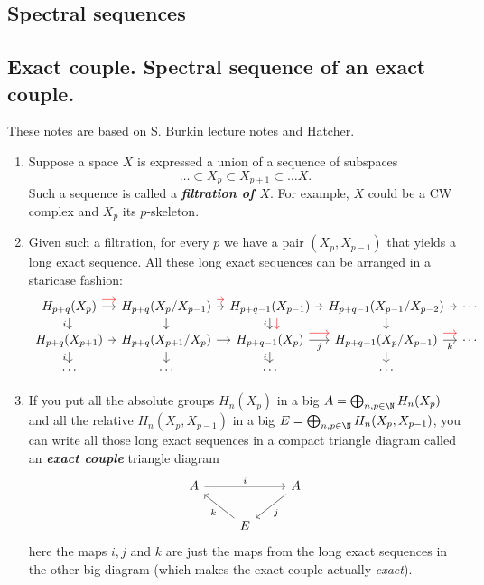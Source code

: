 \begin{remark}
\begin{defn}
\section{Spectral sequences}

\subsection{Exact couple. Spectral sequence of an exact couple.}

These notes are based on S. Burkin lecture notes and Hatcher.

\begin{enumerate}
	\item Suppose a space $X$ is expressed a union of a sequence of subspaces
		\[\ldots\subset X_p\subset X_{p+1}\subset \ldots X.\]
		Such a sequence is called a \textit{\textbf{filtration of $X$}}. For example, $X$ could be a CW complex and $X_p$ its $p$-skeleton.

	\item Given such a filtration, for every $p$ we have a pair $(X_p,X_{p-1})$ that yields a long exact sequence. All these long exact sequences can be arranged in a staricase fashion:
\[\begin{tikzcd}[column sep=tiny,row sep=small]
	H_{p+q}(X_p)\arrow[r]\arrow[d,"i",swap]\arrow[r,red,shift={(0,0.2)}]&H_{p+q}(X_p/X_{p-1})\arrow[r]\arrow[r,red,shift={(0,0.2)}]\arrow[d]&H_{p+q-1}(X_{p-1})\arrow[r]\arrow[d,red,shift={(0.2,0)}]\arrow[d,"i",swap]&H_{p+q-1}(X_{p-1}/X_{p-2})\arrow[d]\arrow[r]&\cdots\\
	H_{p+q}(X_{p+1})\arrow[r]\arrow[d,"i",swap]&H_{p+q}(X_{p+1}/X_{p})\arrow[r]\arrow[d]&H_{p+q-1}(X_{p})\arrow[r,"j",swap]\arrow[r,red,shift={(0,0.2)}]\arrow[d,"i",swap]&H_{p+q-1}(X_{p}/X_{p-1})\arrow[r,red,shift={(0,0.2)}]\arrow[d]\arrow[r,"k",swap]&\cdots\\
	\cdots&\cdots&\cdots&\cdots
\end{tikzcd}\]
	\item If you put all the absolute groups $H_n(X_p)$ in a big $A=\bigoplus_{n,p\in \N}H_n(X_p)$ and all the relative $H_n(X_p,X_{p-1})$ in a big $E=\bigoplus_{n,p\in \N}H_n(X_p,X_{p-1})$, you can write all those long exact sequences in a compact triangle diagram called an \textit{\textbf{exact couple}} triangle diagram
	\[
	\begin{tikzcd}
		A\arrow[rr,"i"]&&A\arrow[dl,"j"]\\
		&E\arrow[ul,"k"]
	\end{tikzcd}
\]
here the maps $i,j$ and $k$ are just the maps from the long exact sequences in the other big diagram (which makes the exact couple actually \textit{exact}).


\end{enumerate}
\end{defn}
\end{remark}
